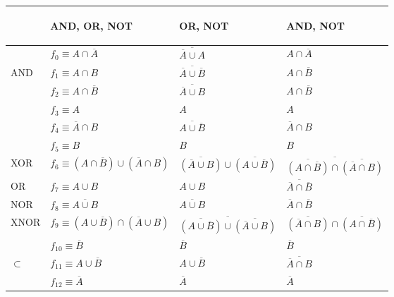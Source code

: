 \documentclass[a4paper]{extarticle}
\begin{document}
\begin{table}[H]
    \centering
    \begin{tabularx}{\textwidth}{|P||l|l|l|}
         \hline
         $ $ & \begin{center} AND, OR, NOT \end{center} & \begin{center} OR, NOT \end{center} & \begin{center} AND, NOT \end{center}\\
         \hline
         \hline
         $ $ & $f_0 \equiv A \cap \overline{A}$ & $\overline{\overline{A} \cup A}$ & $A \cap \overline{A}$\\
         AND & $f_1 \equiv A \cap B$ & $\overline{\overline{A} \cup \overline{B}}$ & $A \cap \overline{B}$\\
         $ $ & $f_2 \equiv A \cap \overline{B}$ & $\overline{\overline{A} \cup B}$ & $A \cap \overline{B}$\\
         $ $ & $f_3 \equiv A$ & $A$ & $A$\\
         $ $ & $f_4 \equiv \overline{A} \cap B$ & $\overline{A \cup \overline{B}}$ & $\overline{A} \cap B$\\
         $ $ & $f_5 \equiv B$ & $B$ & $B$\\
         XOR & $f_6 \equiv (A \cap \overline{B}) \cup (\overline{A} \cap B)$ & $\overline{(\overline{A} \cup B)} \cup \overline{(A \cup \overline{B})}$ & $\overline{\overline{(A \cap \overline{B})} \cap \overline{(\overline{A} \cap B)}}$\\
         OR & $f_7 \equiv A \cup B$ & $A \cup B$ & $\overline{\overline{A} \cap \overline{B}}$\\
         NOR & $f_8 \equiv \overline{A \cup B}$ & $\overline{A \cup B}$ & $\overline{A} \cap \overline{B}$\\
         XNOR & $f_9 \equiv (A \cup \overline{B}) \cap (\overline{A} \cup B)$ & $\overline{\overline{(A \cup \overline{B})} \cup \overline{(\overline{A} \cup B)}}$ & $\overline{(\overline{A} \cap B)} \cap \overline{(A \cap \overline{B})}$\\
         $ $ & $f_{10} \equiv \overline{B}$ & $\overline{B}$ & $\overline{B}$\\
         $\subset$ & $f_{11} \equiv A \cup \overline{B}$ & $A \cup \overline{B}$ & $\overline{\overline{A} \cap B}$\\
         $ $ & $f_{12} \equiv \overline{A}$ & $\overline{A}$ & $\overline{A}$\\

\end{tabularx}
\end{table}
\end{document}
